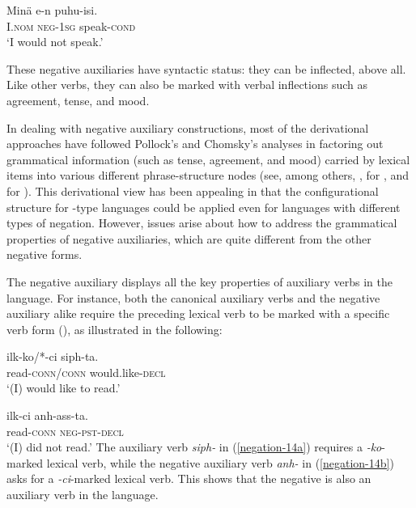 \documentclass[output=paper
	        ,collection
	        ,collectionchapter
 	        ,biblatex
                ,babelshorthands
                ,newtxmath
                ,draftmode
                ,colorlinks, citecolor=brown
]{langscibook}
\begin{document}
\begin{exe}
\begin{xlist}
\begin{exe}
\begin{xlist}
\ea
\gll Min\"{a} e-n puhu-isi. \\
     I.\textsc{nom} \textsc{neg}-\textsc{1sg} speak-\textsc{cond} \\
\glt `I would not speak.'
\z

\noindent
These negative auxiliaries have syntactic status: they can be
inflected, above all. Like other verbs, they can also be marked
with verbal inflections such as agreement, tense, and mood.

In dealing with negative auxiliary constructions,
most of the derivational approaches have
followed Pollock's and Chomsky's analyses in factoring out grammatical
information (such as tense, agreement, and mood) carried by lexical items into various different phrase-structure nodes (see, among others, \citealt{Hagstrom:02}, \citealt{Han:07} for , and \citealt{Vasishth:00} for ).
This derivational view has
been appealing in that the configurational structure for -type
languages could be applied even for languages with different types
of negation. However, issues arise about how to address the grammatical
properties of negative auxiliaries, which are quite different from the
other negative forms.
%
%
%
%

%


%
The  negative auxiliary displays all the key properties of auxiliary verbs in the language. For instance, both the canonical auxiliary verbs and
the negative auxiliary alike require the preceding lexical verb to be marked with a specific verb form (\vform), as illustrated
in the following:

\eal
\ex\label{negation-14a}
\gll ilk-ko/*-ci siph-ta. \\
     read-\textsc{conn}/\textsc{conn} would.like-\textsc{decl} \\
\glt `(I) would like to read.'

\ex\label{negation-14b}
\gll ilk-ci anh-ass-ta. \\
     read-\textsc{conn} \textsc{neg}-\textsc{pst}-\textsc{decl} \\
\glt `(I) did not read.'
\zl
\noindent
The auxiliary verb \textit{siph-} in (\ref{negation-14a}) requires a
\textit{-ko}-marked lexical verb, while the negative auxiliary
 verb \textit{anh-} in (\ref{negation-14b}) asks for a \textit{-ci}-marked lexical
 verb. This shows that the negative is also an auxiliary verb in the language.


\end{xlist}
\end{exe}
\end{xlist}
\end{exe}
\end{document}
